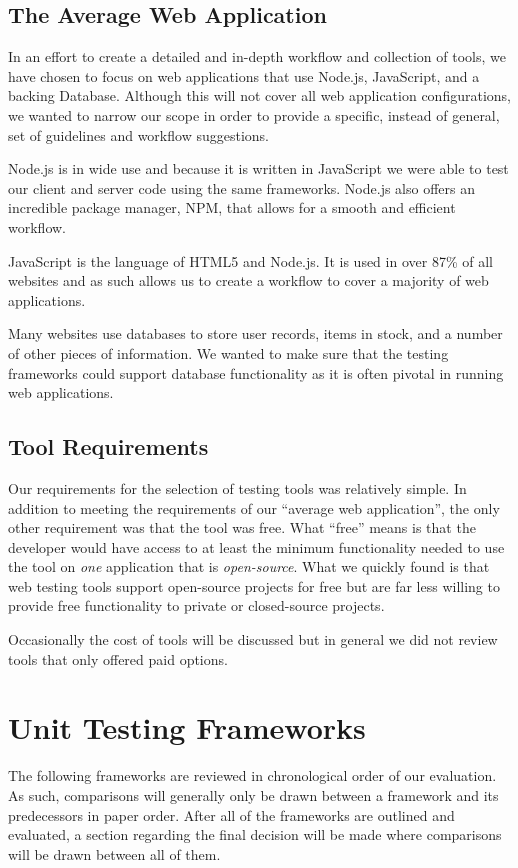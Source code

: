 \documentclass[12pt]{ucthesis}
\begin{document}
\subsection{The Average Web Application}
In an effort to create a detailed and in-depth workflow and collection of tools, we have chosen to focus on web applications that use Node.js, JavaScript, and a backing Database. Although this will not cover all web application configurations, we wanted to narrow our scope in order to provide a specific, instead of general, set of guidelines and workflow suggestions.

Node.js is in wide use and because it is written in JavaScript we were able to test our client and server code using the same frameworks. Node.js also offers an incredible package manager, NPM, that allows for a smooth and efficient workflow.

JavaScript is the language of HTML5 and Node.js. It is used in over 87\% of all websites\cite{JSUsage} and as such allows us to create a workflow to cover a majority of web applications.

Many websites use databases to store user records, items in stock, and a number of other pieces of information. We wanted to make sure that the testing frameworks could support database functionality as it is often pivotal in running web applications.

\subsection{Tool Requirements}
Our requirements for the selection of testing tools was relatively simple. In addition to meeting the requirements of our ``average web application'', the only other requirement was that the tool was free. What ``free'' means is that the developer would have access to at least the minimum functionality needed to use the tool on \emph{one} application that is \emph{open-source}. What we quickly found is that web testing tools support open-source projects for free but are far less willing to provide free functionality to private or closed-source projects. 

Occasionally the cost of tools will be discussed but in general we did not review tools that only offered paid options.

\section{Unit Testing Frameworks}
The following frameworks are reviewed in chronological order of our evaluation. As such, comparisons will generally only be drawn between a framework and its predecessors in paper order. After all of the frameworks are outlined and evaluated, a section regarding the final decision will be made where comparisons will be drawn between all of them. 
\end{document}
